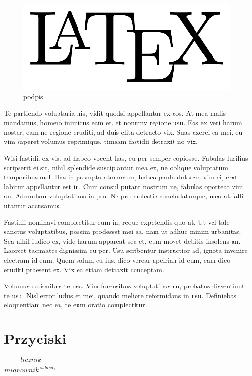 \documentclass{book}
\begin{document}
\begin{figure}
	\centering
	\includegraphics[width=0.7\linewidth]{latex}
	\caption{podpis}
	\label{fig:latex}
\end{figure}
	
	Te partiendo voluptaria his, vidit quodsi appellantur ex eos. At mea malis mandamus, homero inimicus eam et, et nonumy regione usu. Eos ex veri harum noster, eam ne regione eruditi, ad duis clita detracto vix. Suas exerci ea mei, eu vim saperet volumus reprimique, timeam fastidii detraxit no vix.
	
	Wisi fastidii ex vis, ad habeo vocent has, eu per semper copiosae. Fabulas lucilius scripserit ei sit, nihil splendide suscipiantur mea ex, ne oblique voluptatum temporibus mel. Has in prompta atomorum, habeo paulo dolorem vim ei, erat labitur appellantur est in. Cum consul putant nostrum ne, fabulas oporteat vim an. Admodum voluptatibus in pro. Ne pro molestie concludaturque, mea at falli utamur accusamus.
	
	Fastidii nominavi complectitur eum in, reque expetendis quo at. Ut vel tale sanctus voluptatibus, possim prodesset mei ea, nam ut adhuc minim urbanitas. Sea nihil iudico ex, vide harum appareat sea et, eum movet debitis insolens an. Laoreet tacimates dignissim cu per. Usu scribentur instructior ad, ignota invenire electram id eum. Quem solum cu ius, dico verear apeirian id eum, eam dico eruditi praesent ex. Vix ea etiam detraxit conceptam.
	
	Volumus rationibus te nec. Vim forensibus voluptatibus cu, probatus dissentiunt te usu. Nisl error ludus et mei, quando meliore reformidans in usu. Definiebas eloquentiam nec ea, te eum oratio complectitur.
\section{Przyciski}

	$\dfrac{licznik}{mianownik^{asdasd_11}}$
	\label{LastPage}
\end{document}
